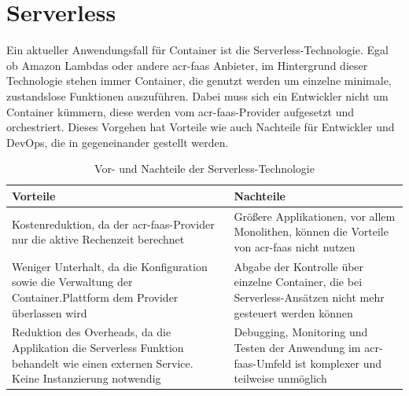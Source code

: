 \section{Serverless}
\label{sec:aktuellesServerless}

Ein aktueller Anwendungsfall für Container ist die Serverless-Technologie. Egal ob Amazon Lambdas oder andere \gls{acr-faas} Anbieter, im Hintergrund dieser Technologie stehen immer Container, die genutzt werden um einzelne minimale, zustandslose Funktionen auszuführen. Dabei muss sich ein Entwickler nicht um Container kümmern, diese werden vom \gls{acr-faas}-Provider aufgesetzt und orchestriert. Dieses Vorgehen hat Vorteile wie auch Nachteile für Entwickler und DevOps, die in  gegeneinander gestellt werden.

\begin{table}[h]
	\renewcommand{\arraystretch}{2.5}
	\begin{center}
		\begin{tabu} to 0.9
			\toprule
			Vorteile & Nachteile\\
			\midrule
			Kostenreduktion, da der \gls{acr-faas}-Provider nur die aktive Rechenzeit berechnet & Größere Applikationen, vor allem Monolithen, können die Vorteile von \gls{acr-faas} nicht nutzen\\
			Weniger Unterhalt, da die Konfiguration sowie die Verwaltung der Container.Plattform dem Provider überlassen wird & Abgabe der Kontrolle über einzelne Container, die bei Serverless-Ansätzen nicht mehr gesteuert werden können\\
			Reduktion des Overheads, da die Applikation die Serverless Funktion behandelt wie einen externen Service. Keine Instanzierung notwendig & Debugging, Monitoring und Testen der Anwendung im \gls{acr-faas}-Umfeld ist komplexer und teilweise unmöglich\\
			\bottomrule
		\end{tabu}
		\caption{Vor- und Nachteile der Serverless-Technologie \citep{ContainersVsServerlessComputing}}
		\label{tab:serverlessAdvantagesDisadvantages}
	\end{center}
\end{table}

